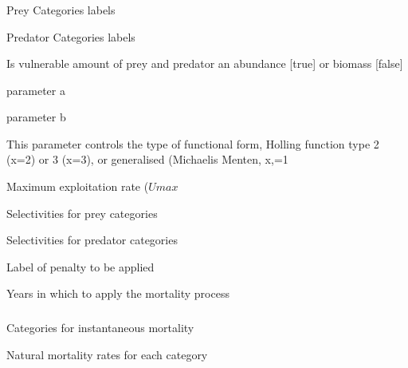 \subsubsection[Mortality Holling Rate]{}

 {Prey Categories labels}

 {Predator Categories labels}

 {Is vulnerable amount of prey and predator an abundance [true] or biomass [false]}

 {parameter a}

 {parameter b}

 {This parameter controls the type of functional form, Holling function type 2 (x=2) or 3 (x=3), or generalised (Michaelis Menten, x,=1}

 {Maximum exploitation rate ($Umax$}

 {Selectivities for prey categories}

 {Selectivities for predator categories}

 {Label of penalty to be applied}

 {Years in which to apply the mortality process}

\subsubsection[Mortality Instantaneous]{}

 {Categories for instantaneous mortality}

 {Natural mortality rates for each category}

